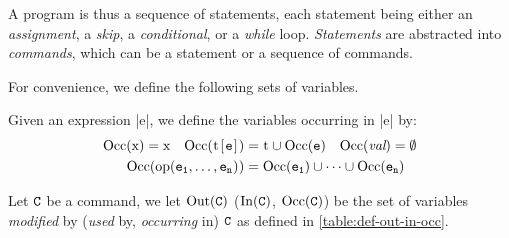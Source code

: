 \documentclass[conference]{IEEEtran}
\begin{document}
A program is thus a sequence of statements, each statement being either
an \emph{assignment},
a \emph{skip}, 
a \emph{conditional}, 
or a \emph{while} loop.
\emph{Statements} are abstracted into \emph{commands}, which can be a statement or a sequence of commands.

For convenience, we define the following sets of variables.

\begin{definition}
	Given an expression \prc|e|, we define the variables occurring in \prc|e| by:
	\[\begin{aligned}[t]
		\Occ(\textnormal{\prc|x|}) &=\textnormal{\prc|x|} & \Occ(\textnormal{\prc|t[|$\comm{e}$\prc|]|}) &=\textnormal{\prc|t|} \cup \Occ(\comm{e})
		& \Occ(\emph{val}) &=\emptyset\\
		\span\span \Occ(\textnormal{\prc|op(|$\comm{e_1}, \hdots,\comm{e_n}$\prc|)|}) &=\Occ(\comm{e_1}) \cup \cdots \cup \Occ(\comm{e_n}) \span\span
	\end{aligned}\]
\end{definition}

\begin{definition}
	\label{def:in-out-occ}
	Let $\mathtt{C}$ be a command, we let  $\operatorname{Out}(\mathtt{C})$ (\resp $\operatorname{In}(\mathtt{C})$, \(\operatorname{Occ}(\mathtt{C})\)) be the set of variables \emph{modified} by (\resp \emph{used} by, \emph{occurring} in) $\mathtt{C}$ as defined in \autoref{table:def-out-in-occ}.
\end{definition}
\end{document}

